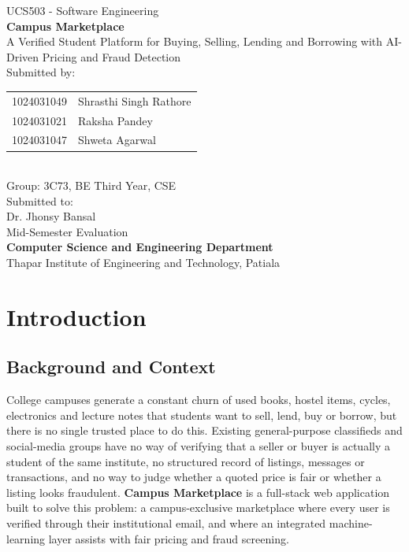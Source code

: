\documentclass[12pt]{report}
\begin{document}
\begin{titlepage}
\centering
\vspace*{1cm}
{\large UCS503 - Software Engineering}\\[1.8cm]

{\Huge \bfseries Campus Marketplace}\\[0.4cm]
{\large A Verified Student Platform for Buying, Selling, Lending and Borrowing with AI-Driven Pricing and Fraud Detection}\\[2.2cm]

{\large Submitted by:}\\[0.4cm]
\begin{tabular}{@{}ll@{}}
1024031049 & \quad Shrasthi Singh Rathore \\
1024031021 & \quad Raksha Pandey \\
1024031047 & \quad Shweta Agarwal \\
\end{tabular}\\[0.6cm]
{\large Group: 3C73, BE Third Year, CSE}\\[2.2cm]

{\large Submitted to:}\\[0.4cm]
{\large Dr. Jhonsy Bansal}\\[2.2cm]

{\large Mid-Semester Evaluation}\\[0.4cm]
{\large\bfseries Computer Science and Engineering Department}\\
{\large Thapar Institute of Engineering and Technology, Patiala}
\vfill
\end{titlepage}

\tableofcontents

\chapter{Introduction}

\section{Background and Context}
College campuses generate a constant churn of used books, hostel items, cycles, electronics
and lecture notes that students want to sell, lend, buy or borrow, but there is no single
trusted place to do this. Existing general-purpose classifieds and social-media groups have
no way of verifying that a seller or buyer is actually a student of the same institute, no
structured record of listings, messages or transactions, and no way to judge whether a quoted
price is fair or whether a listing looks fraudulent. \textbf{Campus Marketplace} is a full-stack
web application built to solve this problem: a campus-exclusive marketplace where every user
is verified through their institutional email, and where an integrated machine-learning layer
assists with fair pricing and fraud screening.
\end{document}
